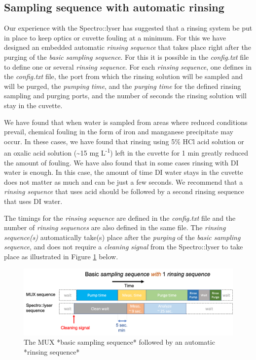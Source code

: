 \documentclass[]{book}
\begin{document}
\hypertarget{sampling-sequence-with-automatic-rinsing}{%
\subsection{Sampling sequence with automatic rinsing}\label{sampling-sequence-with-automatic-rinsing}}

Our experience with the Spectro::lyser has suggested that a rinsing system be put in place to keep optics or cuvette fouling at a minimum. For this we have designed an embedded automatic \emph{rinsing sequence} that takes place right after the purging of the \emph{basic sampling sequence}. For this it is possible in the \emph{config.txt} file to define one or several \emph{rinsing sequence}. For each \emph{rinsing sequence}, one defines in the \emph{config.txt} file, the port from which the rinsing solution will be sampled and will be purged, the \emph{pumping time}, and the \emph{purging time} for the defined rinsing sampling and purging ports, and the number of seconds the rinsing solution will stay in the cuvette.

We have found that when water is sampled from areas where reduced conditions prevail, chemical fouling in the form of iron and manganese precipitate may occur. In these cases, we have found that rinsing using 5\% HCl acid solution or an oxalic acid solution (\textasciitilde{}15 mg L\textsuperscript{-1}) left in the cuvette for 1 min greatly reduced the amount of fouling. We have also found that in some cases rinsing with DI water is enough. In this case, the amount of time DI water stays in the cuvette does not matter as much and can be just a few seconds. We recommend that a \emph{rinsing sequence} that uses acid should be followed by a second rinsing sequence that uses DI water.

The timings for the \emph{rinsing sequence} are defined in the \emph{config.txt} file and the number of \emph{rinsing sequences} are also defined in the same file. The \emph{rinsing sequence(s)} automatically take(s) place after the \emph{purging} of the \emph{basic sampling sequence}, and does not require a \emph{cleaning signal} from the Spectro::lyser to take place as illustrated in Figure \ref{fig:BasicSequenceWith1Rinsing} below.

\begin{figure}

{\centering \includegraphics[width=1\linewidth]{pictures/BasicSequenceWith1Rinsing} 

}

\caption{The MUX *basic sampling sequence* followed by an automatic *rinsing sequence*}\label{fig:BasicSequenceWith1Rinsing}
\end{figure}
\end{document}
